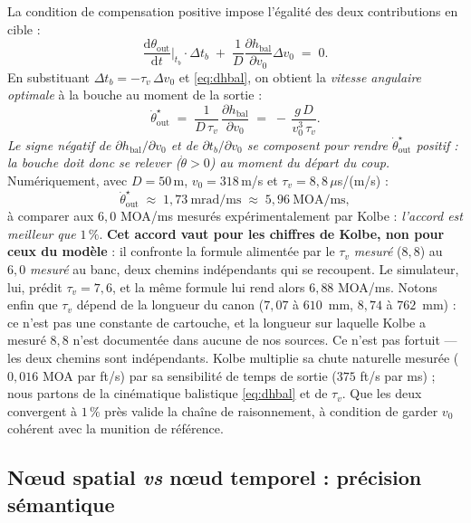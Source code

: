 \documentclass[12pt,a4paper]{article}
\begin{document}
	La condition de compensation positive impose l'égalité des deux contributions en cible :
	\begin{equation}
		\label{eq:compensation}
		\boxed{\;\frac{\mathrm{d}\theta_\text{out}}{\mathrm{d}t}\bigg|_{t_b}\cdot \Delta t_b \;+\; \frac{1}{D}\frac{\partial h_\text{bal}}{\partial v_0}\Delta v_0 \;=\; 0.\;}
	\end{equation}
	En substituant $\Delta t_b = -\tau_v\,\Delta v_0$ et \eqref{eq:dhbal}, on obtient la \emph{vitesse angulaire optimale} à la bouche au moment de la sortie :
	\begin{equation}
		\label{eq:dthetaopt}
		\dot \theta_\text{out}^\star \;=\; \frac{1}{D\,\tau_v}\,\frac{\partial h_\text{bal}}{\partial v_0} \;=\; -\,\frac{g\,D}{v_0^3\,\tau_v}.
	\end{equation}
	\emph{Le signe négatif de $\partial h_\text{bal}/\partial v_0$ et de $\partial t_b/\partial v_0$ se composent pour rendre $\dot\theta_\text{out}^\star$ positif : la bouche doit donc se relever ($\dot\theta>0$) au moment du départ du coup.} Numériquement, avec $D=50$\,m, $v_0 = 318$\,m/s et $\tau_v = 8{,}8\,\mu$s/(m/s) :
	\begin{equation*}
		\dot\theta_\text{out}^\star \;\approx\; 1{,}73\ \text{mrad/ms} \;\approx\; 5{,}96\ \text{MOA/ms},
	\end{equation*}
	à comparer aux $6{,}0$ MOA/ms mesurés expérimentalement par Kolbe : \emph{l'accord est meilleur que} $1\,\%$. \textbf{Cet accord vaut pour les chiffres de Kolbe, non pour ceux du modèle} : il confronte la formule alimentée par le $\tau_v$ \emph{mesuré} ($8{,}8$) au $6{,}0$ \emph{mesuré} au banc, deux chemins indépendants qui se recoupent. Le simulateur, lui, prédit $\tau_v = 7{,}6$, et la même formule lui rend alors $6{,}88$ MOA/ms. Notons enfin que $\tau_v$ dépend de la longueur du canon ($7{,}07$ à $610$~mm, $8{,}74$ à $762$~mm) : ce n'est pas une constante de cartouche, et la longueur sur laquelle Kolbe a mesuré $8{,}8$ n'est documentée dans aucune de nos sources. Ce n'est pas fortuit — les deux chemins sont indépendants. Kolbe multiplie sa chute naturelle mesurée ($0{,}016$ MOA par ft/s) par sa sensibilité de temps de sortie ($375$ ft/s par ms) ; nous partons de la cinématique balistique \eqref{eq:dhbal} et de $\tau_v$. Que les deux convergent à $1\,\%$ près valide la chaîne de raisonnement, à condition de garder $v_0$ cohérent avec la munition de référence.

	\subsection{Nœud spatial \emph{vs} nœud temporel : précision sémantique}
	\label{sec:nodes}
\end{document}
